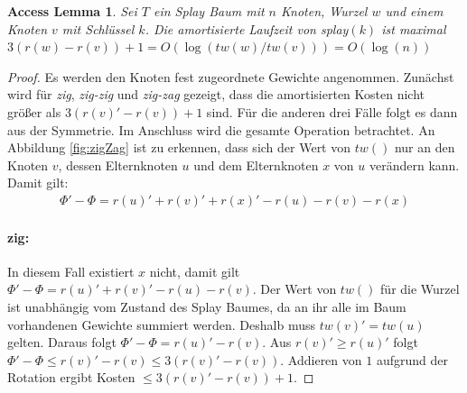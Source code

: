 \documentclass[a4paper,12pt]{article}
\begin{document}
\newtheorem{Lemma1}{Access Lemma}[section] \label{lemmaSplay}
\begin{Lemma1}Sei $T$ ein Splay Baum mit $n$ Knoten, Wurzel $w$ und einem Knoten $v$ mit Schlüssel $k$. Die amortisierte Laufzeit von \textit{splay}$\left(k\right)$ ist maximal $3 \left(r\left(w\right) - r\left(v\right)\right) + 1 = O\left(\log\left(\mathit{tw}\left(w\right) / \mathit{tw}\left(v\right)\right) \right) = O\left(\log\left(n\right)\right)$ \\
	
\end{Lemma1}
\begin{proof}
	Es werden den Knoten fest zugeordnete Gewichte angenommen. Zunächst wird für \textit{zig}, \textit{zig-zig} und \textit{zig-zag} gezeigt, dass die amortisierten Kosten nicht größer als $3 \left(r\left(v\right)' - r\left(v\right)\right) + 1$ sind. Für die anderen drei Fälle folgt es dann aus der Symmetrie. Im Anschluss wird die gesamte Operation  betrachtet. An Abbildung  \ref{fig:zigZag} ist zu erkennen, dass sich der Wert von $\mathit{tw}\left(\right)$ nur an den Knoten $v$, dessen Elternknoten $u$  und dem Elternknoten $x$ von $u$ verändern kann.  Damit gilt:
	\begin{align*}
	\Phi' - \Phi  = r\left(u\right)' +r\left(v\right)' +r\left(x\right)' - r\left(u\right)- r\left(v\right)- r\left(x\right)
	\end{align*}
	
	
	\paragraph{zig:} 
	In diesem Fall existiert $x$ nicht, damit gilt\\  {$ \Phi' - \Phi  = r\left(u\right)' +r\left(v\right)' - r\left(u\right)- r\left(v\right)$}. Der Wert von $\mathit{tw}\left(\right)$ für die Wurzel ist unabhängig vom Zustand des Splay Baumes, da an ihr alle im Baum vorhandenen Gewichte summiert werden. Deshalb muss  $\mathit{tw}\left(v\right)' =  \mathit{tw}\left(u\right)$ gelten. Daraus folgt $ \Phi' - \Phi  = r\left(u\right)'- r\left(v\right)$. Aus $r\left(v\right)' \geq r\left(u\right)'$ folgt \\ $ \Phi' - \Phi \leq  r\left(v\right)'- r\left(v\right) \leq 3\left(r\left(v\right)'- r\left(v\right)\right) $. Addieren von $1$ aufgrund der Rotation ergibt Kosten $\leq 3\left(r\left(v\right)'- r\left(v\right)\right) + 1$.

\end{proof}
\end{document}
